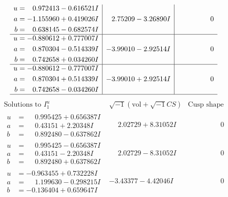 \documentclass[1p]{elsarticle_modified}
\theoremstyle{definition}
\newcommand{\I}{\sqrt{-1}}
\begin{document}
$$\begin{array}{c|c|c}
\begin{aligned}
u &= \phantom{-}0.972413 - 0.616521 I \\
a &= -1.155960 + 0.419026 I \\
b &= \phantom{-}0.638145 - 0.682574 I\end{aligned}
 & \phantom{-}2.75209 - 3.26890 I & \phantom{-0.000000 } 0 \\ \hline\begin{aligned}
u &= -0.880612 + 0.777007 I \\
a &= \phantom{-}0.870304 - 0.514339 I \\
b &= \phantom{-}0.742658 + 0.034260 I\end{aligned}
 & -3.99010 - 2.92514 I & \phantom{-0.000000 } 0 \\ \hline\begin{aligned}
u &= -0.880612 - 0.777007 I \\
a &= \phantom{-}0.870304 + 0.514339 I \\
b &= \phantom{-}0.742658 - 0.034260 I\end{aligned}
 & -3.99010 + 2.92514 I & \phantom{-0.000000 } 0\\
 \hline 
 \end{array}$$\newpage$$\begin{array}{c|c|c}  
\text{Solutions to }I^u_{1}& \I (\text{vol} + \sqrt{-1}CS) & \text{Cusp shape}\\
 \hline 
\begin{aligned}
u &= \phantom{-}0.995425 + 0.656387 I \\
a &= \phantom{-}0.43151 + 2.20348 I \\
b &= \phantom{-}0.892480 - 0.637862 I\end{aligned}
 & \phantom{-}2.02729 + 8.31052 I & \phantom{-0.000000 } 0 \\ \hline\begin{aligned}
u &= \phantom{-}0.995425 - 0.656387 I \\
a &= \phantom{-}0.43151 - 2.20348 I \\
b &= \phantom{-}0.892480 + 0.637862 I\end{aligned}
 & \phantom{-}2.02729 - 8.31052 I & \phantom{-0.000000 } 0 \\ \hline\begin{aligned}
u &= -0.963455 + 0.732228 I \\
a &= \phantom{-}1.199630 - 0.298215 I \\
b &= -0.136404 + 0.659647 I\end{aligned}
 & -3.43377 - 4.42046 I & \phantom{-0.000000 } 0 \\ \hline\begin{aligned}

\end{aligned}
\end{array}$$
\end{document}
